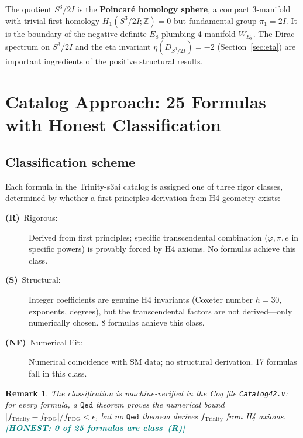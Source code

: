 \documentclass[12pt,a4paper]{article}
\newtheorem{remark}[theorem]{Remark}
\newcommand{\TwoI}{2I}
\newcommand{\HON}[1]{\textcolor{teal}{\textbf{[HONEST: #1]}}}
\newcommand{\Qed}{\texttt{Qed}}
\newcommand{\Rclass}{\textbf{(R)}}
\newcommand{\Sclass}{\textbf{(S)}}
\newcommand{\NFclass}{\textbf{(NF)}}
\begin{document}
The quotient \(S^3/\TwoI\) is the \textbf{Poincar\'e homology sphere}, a compact
3-manifold with trivial first homology \(H_1(S^3/\TwoI;\mathbb{Z}) = 0\) but fundamental
group \(\pi_1 = \TwoI\). It is the boundary of the negative-definite \(E_8\)-plumbing
4-manifold \(W_{E_8}\). The Dirac spectrum on \(S^3/\TwoI\) and the eta invariant
\(\eta(D_{S^3/\TwoI}) = -2\) (Section~\ref{sec:eta}) are important ingredients of the
positive structural results.


\section{Catalog Approach: 25 Formulas with Honest Classification}
\label{sec:catalog}

\subsection{Classification scheme}

Each formula in the Trinity-s3ai catalog is assigned one of three rigor classes, determined
by whether a first-principles derivation from H4 geometry exists:
\begin{description}
  \item[\Rclass~Rigorous:] Derived from first principles; specific transcendental combination
    (\(\varphi, \pi, e\) in specific powers) is provably forced by H4 axioms. No formulas
    achieve this class.
  \item[\Sclass~Structural:] Integer coefficients are genuine H4 invariants (Coxeter number
    \(h=30\), exponents, degrees), but the transcendental factors are not derived---only
    numerically chosen. 8 formulas achieve this class.
  \item[\NFclass~Numerical Fit:] Numerical coincidence with SM data; no structural derivation.
    17 formulas fall in this class.
\end{description}

\begin{remark}
The classification is machine-verified in the Coq file \texttt{Catalog42.v}:
for every formula, a \(\Qed\) theorem proves the numerical bound
\(\bigl|f_{\mathrm{Trinity}} - f_{\mathrm{PDG}}\bigr|/f_{\mathrm{PDG}} < \epsilon\),
but no \(\Qed\) theorem derives \(f_{\mathrm{Trinity}}\) from H4 axioms.
\HON{0 of 25 formulas are class~\Rclass}
\end{remark}
\end{document}
